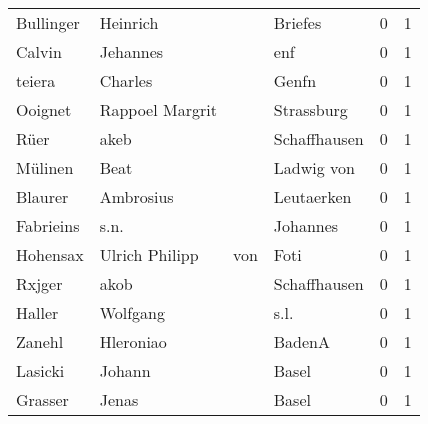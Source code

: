 \begin{center}
\begin{tiny}
\begin{longtabu}{llllrr}
                Bullinger &                           Heinrich &             &                                     Briefes &          0 &         1 \\
                   Calvin &                           Jehannes &             &                                         enf &          0 &         1 \\
                   teiera &                            Charles &             &                                       Genfn &          0 &         1 \\
                  Ooignet &                    Rappoel Margrit &             &                                  Strassburg &          0 &         1 \\
                     Rüer &                               akeb &             &                                Schaffhausen &          0 &         1 \\
                  Mülinen &                               Beat &             &                                  Ladwig von &          0 &         1 \\
                  Blaurer &                          Ambrosius &             &                                  Leutaerken &          0 &         1 \\
                Fabrieins &                               s.n. &             &                                    Johannes &          0 &         1 \\
                 Hohensax &                     Ulrich Philipp &         von &                                        Foti &          0 &         1 \\
                   Rxjger &                               akob &             &                                Schaffhausen &          0 &         1 \\
                   Haller &                           Wolfgang &             &                                        s.l. &          0 &         1 \\
                   Zanehl &                          Hleroniao &             &                                      BadenA &          0 &         1 \\
                  Lasicki &                             Johann &             &                                       Basel &          0 &         1 \\
                  Grasser &                              Jenas &             &                                       Basel &          0 &         1 \\

\end{longtabu}
\end{tiny}
\end{center}
